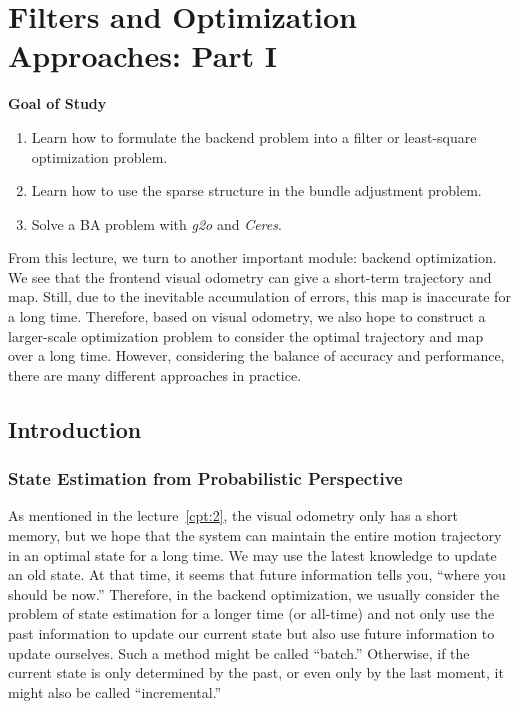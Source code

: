 \chapter{Filters and Optimization Approaches: Part I}
\label{cpt:backend1}
\label{cpt:9}
\begin{mdframed}  
	\textbf{Goal of Study}
	\begin{enumerate}[labelindent=0em,leftmargin=1.5em]
		\item Learn how to formulate the backend problem into a filter or least-square optimization problem.
		\item Learn how to use the sparse structure in the bundle adjustment problem. 
		\item Solve a BA problem with \textit{g2o} and \textit{Ceres}.
	\end{enumerate}
\end{mdframed}

From this lecture, we turn to another important module: backend optimization.
We see that the frontend visual odometry can give a short-term trajectory and map. Still, due to the inevitable accumulation of errors, this map is inaccurate for a long time. Therefore, based on visual odometry, we also hope to construct a larger-scale optimization problem to consider the optimal trajectory and map over a long time. However, considering the balance of accuracy and performance, there are many different approaches in practice.

%

\newpage
\section{Introduction}
\subsection{State Estimation from Probabilistic Perspective}
As mentioned in the lecture~\ref{cpt:2}, the visual odometry only has a short memory, but we hope that the system can maintain the entire motion trajectory in an optimal state for a long time. We may use the latest knowledge to update an old state. At that time, it seems that future information tells you, ``where you should be now.'' Therefore, in the backend optimization, we usually consider the problem of state estimation for a longer time (or all-time) and not only use the past information to update our current state but also use future information to update ourselves. Such a method might be called ``batch.'' Otherwise, if the current state is only determined by the past, or even only by the last moment, it might also be called ``incremental.''


